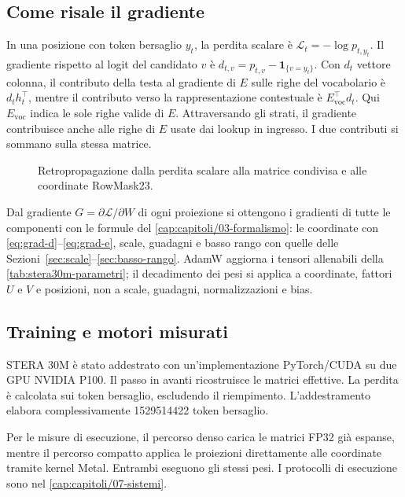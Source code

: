 \subsection{Come risale il gradiente}

In una posizione con token bersaglio $y_t$, la perdita scalare è $\mathcal L_t=-\log p_{t,y_t}$. Il gradiente rispetto al logit del candidato $v$ è $d_{t,v}=p_{t,v}-\mathbf{1}_{\{v=y_t\}}$. Con $d_t$ vettore colonna, il contributo della testa al gradiente di $E$ sulle righe del vocabolario è $d_t h_t^\top$, mentre il contributo verso la rappresentazione contestuale è $E_{\mathrm{voc}}^\top d_t$. Qui $E_{\mathrm{voc}}$ indica le sole righe valide di $E$. Attraversando gli strati, il gradiente contribuisce anche alle righe di $E$ usate dai lookup in ingresso. I due contributi si sommano sulla stessa matrice.

\begin{figure}[htbp]
\centering

\caption{Retropropagazione dalla perdita scalare alla matrice condivisa e alle coordinate RowMask23.}
\label{fig:stera30m-backward}
\end{figure}

Dal gradiente $G=\partial\mathcal L/\partial W$ di ogni proiezione si ottengono i gradienti di tutte le componenti con le formule del \autoref{cap:capitoli/03-formalismo}: le coordinate con \eqref{eq:grad-d}--\eqref{eq:grad-e}, scale, guadagni e basso rango con quelle delle Sezioni~\ref{sec:scale}--\ref{sec:basso-rango}. AdamW aggiorna i tensori allenabili della \autoref{tab:stera30m-parametri}; il decadimento dei pesi si applica a coordinate, fattori $U$ e $V$ e posizioni, non a scale, guadagni, normalizzazioni e bias.

\subsection{Training e motori misurati}

STERA 30M è stato addestrato con un'implementazione PyTorch/CUDA su due GPU NVIDIA P100. Il passo in avanti ricostruisce le matrici effettive. La perdita è calcolata sui token bersaglio, escludendo il riempimento. L'addestramento elabora complessivamente \num{1529514422} token bersaglio.

Per le misure di esecuzione, il percorso denso carica le matrici FP32 già espanse, mentre il percorso compatto applica le proiezioni direttamente alle coordinate tramite kernel Metal. Entrambi eseguono gli stessi pesi. I protocolli di esecuzione sono nel \autoref{cap:capitoli/07-sistemi}.
